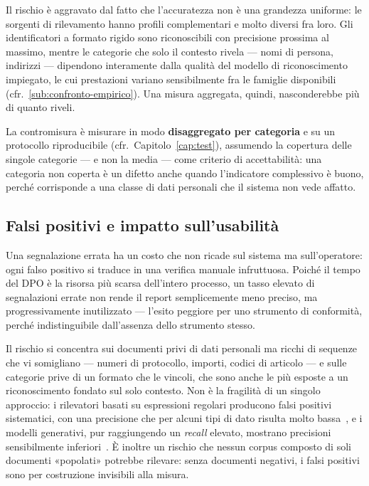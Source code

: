 Il rischio è aggravato dal fatto che l'accuratezza non è una grandezza uniforme: le sorgenti di rilevamento hanno profili complementari e molto diversi fra loro. Gli identificatori a formato rigido sono riconoscibili con precisione prossima al massimo, mentre le categorie che solo il contesto rivela --- nomi di persona, indirizzi --- dipendono interamente dalla qualità del modello di riconoscimento impiegato, le cui prestazioni variano sensibilmente fra le famiglie disponibili (cfr.~\ref{sub:confronto-empirico}). Una misura aggregata, quindi, nasconderebbe più di quanto riveli. \medskip

La contromisura è misurare in modo \textbf{disaggregato per categoria} e su un protocollo riproducibile (cfr.~Capitolo~\ref{cap:test}), assumendo la copertura delle singole categorie --- e non la media --- come criterio di accettabilità: una categoria non coperta è un difetto anche quando l'indicatore complessivo è buono, perché corrisponde a una classe di dati personali che il sistema non vede affatto.

\subsection{Falsi positivi e impatto sull'usabilità}
\label{sub:rischio-falsi-positivi}
Una segnalazione errata ha un costo che non ricade sul sistema ma sull'operatore: ogni falso positivo si traduce in una verifica manuale infruttuosa. Poiché il tempo del DPO è la risorsa più scarsa dell'intero processo, un tasso elevato di segnalazioni errate non rende il report semplicemente meno preciso, ma progressivamente inutilizzato --- l'esito peggiore per uno strumento di conformità, perché indistinguibile dall'assenza dello strumento stesso. \medskip

Il rischio si concentra sui documenti privi di dati personali ma ricchi di sequenze che vi somigliano --- numeri di protocollo, importi, codici di articolo --- e sulle categorie prive di un formato che le vincoli, che sono anche le più esposte a un riconoscimento fondato sul solo contesto. Non è la fragilità di un singolo approccio: i rilevatori basati su espressioni regolari producono falsi positivi sistematici, con una precisione che per alcuni tipi di dato risulta molto bassa~\cite{elazarWhatsMyBigData2024}, e i modelli generativi, pur raggiungendo un \textit{recall} elevato, mostrano precisioni sensibilmente inferiori~\cite{zambranoDeidentifyingStudentPersonally2025}. È inoltre un rischio che nessun corpus composto di soli documenti «popolati» potrebbe rilevare: senza documenti negativi, i falsi positivi sono per costruzione invisibili alla misura. \medskip

